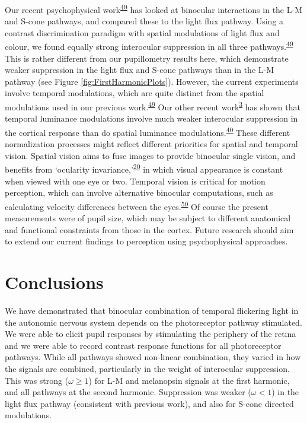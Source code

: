 \documentclass[
]{article}
\begin{document}
Our recent psychophysical work\textsuperscript{\protect\hyperlink{ref-Baker2024}{49}} has looked at binocular interactions in the L-M and S-cone pathways, and compared these to the light flux pathway. Using a contrast discrimination paradigm with spatial modulations of light flux and colour, we found equally strong interocular suppression in all three pathways.\textsuperscript{\protect\hyperlink{ref-Baker2024}{49}} This is rather different from our pupillometry results here, which demonstrate weaker suppression in the light flux and S-cone pathways than in the L-M pathway (see Figure \ref{fig:FirstHarmonicPlots}). However, the current experiments involve temporal modulations, which are quite distinct from the spatial modulations used in our previous work.\textsuperscript{\protect\hyperlink{ref-Baker2024}{49}} Our other recent work\textsuperscript{\protect\hyperlink{ref-Segala2023}{3}} has shown that temporal luminance modulations involve much weaker interocular suppression in the cortical response than do spatial luminance modulations.\textsuperscript{\protect\hyperlink{ref-Baker2017}{40}} These different normalization processes might reflect different priorities for spatial and temporal vision. Spatial vision aims to fuse images to provide binocular single vision, and benefits from `ocularity invariance,'\textsuperscript{\protect\hyperlink{ref-Baker2007}{20}} in which visual appearance is constant when viewed with one eye or two. Temporal vision is critical for motion perception, which can involve alternative binocular computations, such as calculating velocity differences between the eyes.\textsuperscript{\protect\hyperlink{ref-Kaestner2019}{50}} Of course the present measurements were of pupil size, which may be subject to different anatomical and functional constraints from those in the cortex. Future research should aim to extend our current findings to perception using psychophysical approaches.

\hypertarget{conclusions}{%
\section{Conclusions}\label{conclusions}}

We have demonstrated that binocular combination of temporal flickering light in the autonomic nervous system depends on the photoreceptor pathway stimulated. We were able to elicit pupil responses by stimulating the periphery of the retina and we were able to record contrast response functions for all photoreceptor pathways. While all pathways showed non-linear combination, they varied in how the signals are combined, particularly in the weight of interocular suppression. This was strong (\(\omega \ge 1\)) for L-M and melanopsin signals at the first harmonic, and all pathways at the second harmonic. Suppression was weaker (\(\omega < 1\)) in the light flux pathway (consistent with previous work), and also for S-cone directed modulations.
\end{document}

